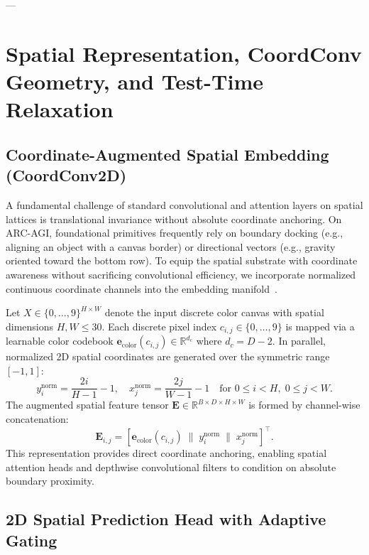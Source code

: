 \documentclass[11pt,a4paper]{article}
\theoremstyle{plain}
\theoremstyle{definition}
\theoremstyle{remark}
\begin{document}
---

\section{Spatial Representation, CoordConv Geometry, and Test-Time Relaxation}
\label{sec:spatial_head}

\subsection{Coordinate-Augmented Spatial Embedding (CoordConv2D)}

A fundamental challenge of standard convolutional and attention layers on spatial lattices is translational invariance without absolute coordinate anchoring. On ARC-AGI, foundational primitives frequently rely on boundary docking (e.g., aligning an object with a canvas border) or directional vectors (e.g., gravity oriented toward the bottom row). To equip the spatial substrate with coordinate awareness without sacrificing convolutional efficiency, we incorporate normalized continuous coordinate channels into the embedding manifold~\cite{liu2018coordconv}.

Let $X \in \{0, \dots, 9\}^{H \times W}$ denote the input discrete color canvas with spatial dimensions $H, W \le 30$. Each discrete pixel index $c_{i,j} \in \{0, \dots, 9\}$ is mapped via a learnable color codebook $\mathbf{e}_{\mathrm{color}}(c_{i,j}) \in \mathbb{R}^{d_c}$ where $d_c = D - 2$. In parallel, normalized 2D spatial coordinates are generated over the symmetric range $[-1, 1]$:
\begin{equation}
    y_i^{\mathrm{norm}} = \frac{2i}{H - 1} - 1, \quad x_j^{\mathrm{norm}} = \frac{2j}{W - 1} - 1 \quad \text{for } 0 \le i < H, \; 0 \le j < W.
\end{equation}
The augmented spatial feature tensor $\mathbf{E} \in \mathbb{R}^{B \times D \times H \times W}$ is formed by channel-wise concatenation:
\begin{equation}
    \mathbf{E}_{i,j} = \left[ \mathbf{e}_{\mathrm{color}}(c_{i,j}) \;\|\; y_i^{\mathrm{norm}} \;\|\; x_j^{\mathrm{norm}} \right]^\top.
\end{equation}
This representation provides direct coordinate anchoring, enabling spatial attention heads and depthwise convolutional filters to condition on absolute boundary proximity.

\subsection{2D Spatial Prediction Head with Adaptive Gating}
\end{document}
